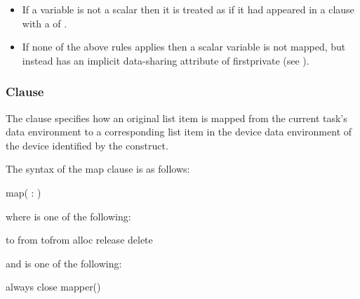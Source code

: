 \begin{itemize}

\item If a variable is not a scalar then it is treated as if it had appeared 
    in a  clause with a  of .


\item If none of the above rules applies then a scalar variable is not
mapped, but instead has an implicit data-sharing attribute of
firstprivate (see ).
\end{itemize}

\subsubsection{ Clause}
\label{subsec:map Clause}
\summary
The  clause specifies how an original list item is mapped from the current task's data environment to a corresponding list item in the device data environment of the device identified by the construct.

\syntax
The syntax of the map clause is as follows:

\begin{ompSyntax}
map(\plc{[ [map-type-modifier[,] [map-type-modifier[,] ...] map-type} : \plc{] list})
\end{ompSyntax}

where  is one of the following:

\begin{indentedcodelist}
to
from
tofrom
alloc
release
delete
\end{indentedcodelist}

and  is one of the following:

\begin{indentedcodelist}
always
close
mapper()
\end{indentedcodelist}

